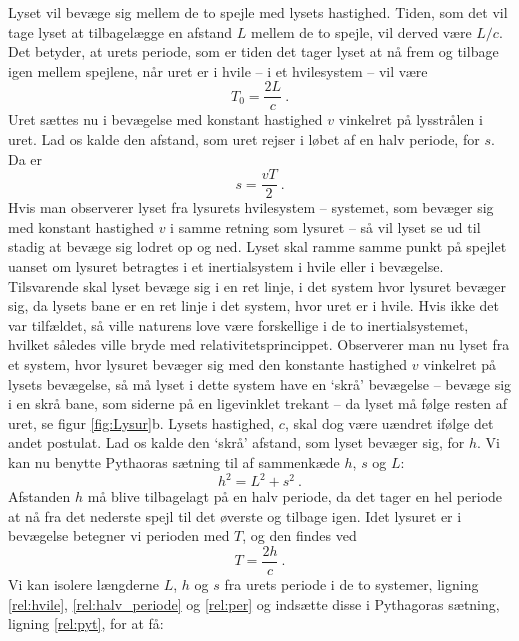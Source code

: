 Lyset vil bevæge sig mellem de to spejle med lysets hastighed. Tiden, som det vil tage lyset at tilbagelægge en afstand $L$ mellem de to spejle, vil derved være $L/c$. Det betyder, at urets periode, som er tiden det tager lyset at nå frem og tilbage igen mellem spejlene, når uret er i hvile -- i et hvilesystem -- vil være
\begin{equation} \label{rel:hvile}
T_0=\frac{2L}{c} \: .
\end{equation}
Uret sættes nu i bevægelse med konstant hastighed $v$ vinkelret på lysstrålen i uret.
Lad os kalde den afstand, som uret rejser i løbet af en halv periode, for $s$. Da er
\begin{equation} \label{rel:halv_periode}
s=\frac{vT}{2} \: .
\end{equation}
Hvis man observerer lyset fra lysurets hvilesystem -- systemet, som bevæger sig med konstant hastighed $v$ i samme retning som lysuret -- så vil lyset se ud til stadig at bevæge sig lodret op og ned. Lyset skal ramme samme punkt på spejlet uanset om lysuret betragtes i et inertialsystem i hvile eller i bevægelse. Tilsvarende skal lyset bevæge sig i en ret linje, i det system hvor lysuret bevæger sig, da lysets bane er en ret linje i det system, hvor uret er i hvile. Hvis ikke det var tilfældet, så ville naturens love være forskellige i de to inertialsystemet, hvilket således ville bryde med relativitetsprincippet. Observerer man nu lyset fra et system, hvor lysuret bevæger sig med den konstante hastighed $v$ vinkelret på lysets bevægelse, så må lyset i dette system have en `skrå' bevægelse -- bevæge sig i en skrå bane, som siderne på en ligevinklet trekant -- da lyset må følge resten af uret, se figur \ref{fig:Lysur}b. Lysets hastighed, $c$, skal dog være uændret ifølge det andet postulat.
Lad os kalde den `skrå' afstand, som lyset bevæger sig, for $h$.
Vi kan nu benytte Pythaoras sætning til af sammenkæde $h$, $s$ og $L$:
\begin{equation}
h^2=L^2+s^2 \: .\label{rel:pyt}
\end{equation}
Afstanden $h$ må blive tilbagelagt på en halv periode, da det tager en hel periode at nå fra det nederste spejl til det øverste og tilbage igen. Idet lysuret er i bevægelse betegner vi perioden med $T$, og den findes ved
\begin{equation}
T=\frac{2h}{c} \label{rel:per}\: .
\end{equation}
Vi kan isolere længderne $L$, $h$ og $s$ fra urets periode i de to systemer, ligning \eqref{rel:hvile}, \eqref{rel:halv_periode} og \eqref{rel:per} og indsætte disse i Pythagoras sætning, ligning \eqref{rel:pyt}, for at få:
